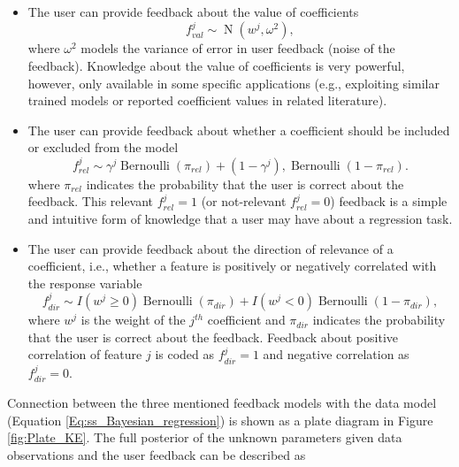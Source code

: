 \documentclass[dissertation,math,vertlayout,pdfa,colorlinks]{aaltoseries}
\DeclareMathOperator{\bernoullipdf}{Bernoulli}
\DeclareMathOperator{\normalpdf}{N}
\begin{document}
\begin{itemize}
	\item The user can provide feedback about the value of coefficients
	\begin{equation}\label{Eq:fb_on_val_coeff}
	f_{val}^{j} \sim \normalpdf(w^j, \omega^2),
	\end{equation}
	\noindent where $\omega^2$ models the variance of error in user feedback (noise of the feedback). Knowledge about the value of coefficients is very powerful, however, only available in some specific applications (e.g., exploiting similar trained models or reported coefficient values in related literature).
	 
	\item The user can provide feedback about whether a coefficient should be included or excluded from the model
	\begin{equation}\label{Eq:fb_on_rel_coeff}
	f_{rel}^{j} \sim \gamma^j \bernoullipdf(\pi_{rel}) + (1 - \gamma^j), \bernoullipdf(1 - \pi_{rel}).
	\end{equation}
	\noindent where $\pi_{rel}$ indicates the probability that the user is correct about the feedback. This relevant $f_{rel}^{j}=1$ (or not-relevant $f_{rel}^{j}=0$) feedback is a simple and intuitive form of knowledge that a user may have about a regression task.
	 
	\item The user can provide feedback about the direction of relevance of a coefficient, i.e., whether a feature is positively or negatively correlated with the response variable
	\begin{equation}\label{Eq:fb_on_dir_coeff}
	f_{dir}^{j} \sim I(w^j \geq 0) \bernoullipdf(\pi_{dir}) + I(w^j < 0) \bernoullipdf(1 - \pi_{dir}),
	\end{equation}
	\noindent where $w^j$ is the weight of the $j^{th}$ coefficient and $\pi_{dir}$ indicates the probability that the user is correct about the feedback. Feedback about positive correlation of feature $j$ is coded as $f_{dir}^{j}=1$ and negative correlation as $f_{dir}^{j}=0$.
\end{itemize}



\noindent Connection between the three mentioned feedback models with the data model (Equation \ref{Eq:ss_Bayesian_regression}) is shown as a plate diagram in Figure \ref{fig:Plate_KE}. The full posterior of the unknown parameters given data observations and the user feedback can be described as 
\end{document}
